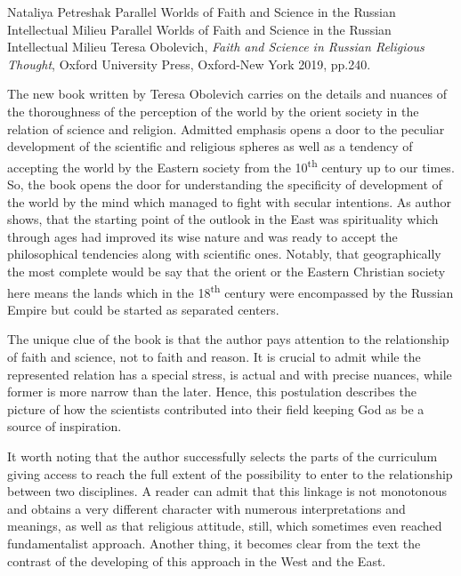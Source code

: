 \begin{recplenv}{Nataliya Petreshak}
	{Parallel Worlds of Faith and Science in the Russian Intellectual Milieu}
	{Parallel Worlds of Faith and Science in the Russian Intellectual Milieu}
	{Teresa Obolevich, \textit{Faith and Science in Russian Religious Thought}, Oxford University Press, Oxford-New York 2019,
		pp.240.}
 





The new book written by Teresa Obolevich carries on the details and nuances of the thoroughness of the
perception of the world by the orient society in the relation of science and religion. Admitted emphasis opens a door
to the peculiar development of the scientific and religious spheres as well as a tendency of accepting the world by the
Eastern society from the 10\textsuperscript{th}  century up to our times. So, the book opens the door for understanding
the specificity of development of the world by the mind which managed to fight with secular intentions. As author
shows, that the starting point of the outlook in the East was spirituality which through ages had improved its wise
nature and was ready to accept the philosophical tendencies along with scientific ones. Notably, that geographically
the most complete would be say that the orient or the Eastern Christian society here means the lands which in the
18\textsuperscript{th} century were encompassed by the Russian Empire but could be started as separated centers.


The unique clue of the book is that the author pays attention to the relationship of faith and science, not to faith and
reason. It is crucial to admit while the represented relation has a special stress, is actual and with precise nuances,
while former is more narrow than the later. Hence, this postulation describes the picture of how the scientists
contributed into their field keeping God as be a source of inspiration.


It worth noting that the author successfully selects the parts of the curriculum giving access to reach the full extent
of the possibility to enter to the relationship between two disciplines. A reader can admit that this linkage is not
monotonous and obtains a very different character with numerous interpretations and meanings, as well as that religious
attitude, still, which sometimes even reached fundamentalist approach. Another thing, it becomes clear from the text
the contrast of the developing of this approach in the West and the East.



\end{recplenv}
